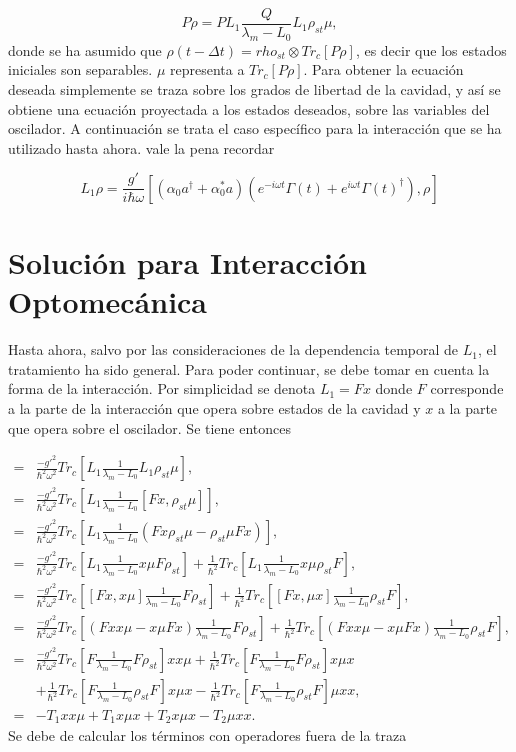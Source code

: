 \documentclass[a4paper,10pt]{report}
\begin{document}
\begin{equation}
P\dot{\rho} = PL_1 \frac{Q}{\lambda_m-L_0}L_1\rho_{st}\mu,
\end{equation} donde se ha asumido que $\rho(t-\Delta t)=rho_{st} \otimes Tr_c[P\rho]$, es decir que los estados iniciales son separables. $\mu$ representa a $Tr_c[P\rho]$. Para obtener la ecuación deseada simplemente se traza sobre los grados de libertad de la cavidad, y así se obtiene una ecuación proyectada a los estados deseados, sobre las variables del oscilador. A continuación se trata el caso específico para la interacción que se ha utilizado hasta ahora. vale la pena recordar

\begin{equation}
L_1\rho= \frac{g'}{i\hbar \omega}[(\alpha_0 a^{\dagger}+ \alpha_0^* a)(e^{-i\omega t}\Gamma(t)+e^{i\omega t}\Gamma(t)^{\dagger}),\rho]
\end{equation} 
 
\section{Solución para Interacción Optomecánica}

Hasta ahora, salvo por las consideraciones de la dependencia temporal de $L_1$, el tratamiento ha sido general. Para poder continuar, se debe tomar en cuenta la forma de la interacción. Por simplicidad se denota $L_1=Fx$ donde $F$ corresponde a la parte de la interacción que opera sobre estados de la cavidad y $x$ a la parte que opera sobre el oscilador. Se tiene entonces

\begin{align*}
=&\frac{-g'^2}{\hbar^2\omega^2} Tr_c[L_1\frac{1}{\lambda_m - L_0}L_1 \rho_{st}\mu],\\
=&\frac{-g'^2}{\hbar^2\omega^2} Tr_c[L_1\frac{1}{\lambda_m - L_0}[Fx, \rho_{st}\mu]],\\
=&\frac{-g'^2}{\hbar^2\omega^2} Tr_c[L_1\frac{1}{\lambda_m - L_0}(Fx\rho_{st}\mu-\rho_{st}\mu Fx)],\\
=&\frac{-g'^2}{\hbar^2\omega^2} Tr_c[L_1\frac{1}{\lambda_m - L_0}x\mu F\rho_{st}]+\frac{1}{\hbar^2}Tr_c[L_1\frac{1}{\lambda_m - L_0}x\mu \rho_{st}F],\\
=&\frac{-g'^2}{\hbar^2\omega^2} Tr_c[[Fx,x\mu]\frac{1}{\lambda_m - L_0} F\rho_{st}]+\frac{1}{\hbar^2}Tr_c[[Fx,\mu x]\frac{1}{\lambda_m - L_0}\rho_{st}F],\\
=&\frac{-g'^2}{\hbar^2\omega^2} Tr_c[(Fxx\mu-x\mu Fx)\frac{1}{\lambda_m - L_0} F\rho_{st}]+\frac{1}{\hbar^2}Tr_c[(Fxx\mu-x\mu Fx)\frac{1}{\lambda_m - L_0}\rho_{st}F],\\
=&\frac{-g'^2}{\hbar^2\omega^2} Tr_c[F\frac{1}{\lambda_m - L_0}F\rho_{st}]xx\mu+\frac{1}{\hbar^2}Tr_c[F\frac{1}{\lambda_m - L_0}F\rho_{st}]x\mu x\\
 &+\frac{1}{\hbar^2} Tr_c[F\frac{1}{\lambda_m - L_0}\rho_{st}F]x\mu x-\frac{1}{\hbar^2}Tr_c[F\frac{1}{\lambda_m - L_0}\rho_{st}F]\mu xx,\\
=&-T_1xx\mu+T_1x\mu x + T_2x\mu x - T_2\mu xx.
\end{align*} Se debe de calcular los términos con operadores fuera de la traza
\end{document}
